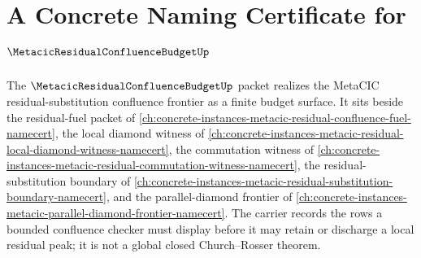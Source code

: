 \chapter{A Concrete Naming Certificate for $\MetacicResidualConfluenceBudgetUp$}
\label{ch:concrete-instances-metacic-residual-confluence-budget-namecert}

The $\MetacicResidualConfluenceBudgetUp$ packet realizes the MetaCIC residual-substitution confluence frontier as a finite budget surface. It sits beside the residual-fuel packet of \autoref{ch:concrete-instances-metacic-residual-confluence-fuel-namecert}, the local diamond witness of \autoref{ch:concrete-instances-metacic-residual-local-diamond-witness-namecert}, the commutation witness of \autoref{ch:concrete-instances-metacic-residual-commutation-witness-namecert}, the residual-substitution boundary of \autoref{ch:concrete-instances-metacic-residual-substitution-boundary-namecert}, and the parallel-diamond frontier of \autoref{ch:concrete-instances-metacic-parallel-diamond-frontier-namecert}. The carrier records the rows a bounded confluence checker must display before it may retain or discharge a local residual peak; it is not a global closed Church--Rosser theorem.

